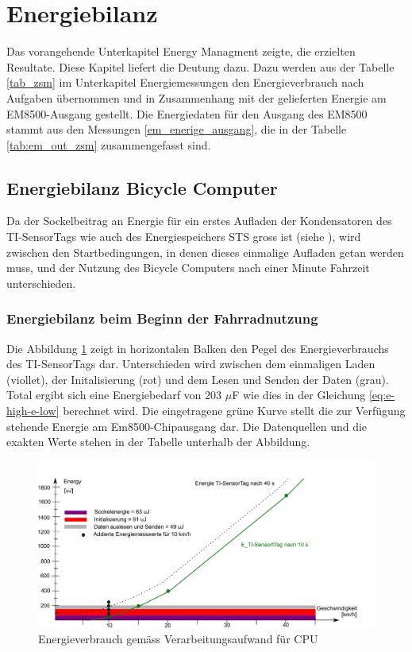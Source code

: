 \section{Energiebilanz}

Das vorangehende Unterkapitel Energy Managment zeigte, die erzielten Resultate. Diese Kapitel liefert die Deutung dazu. Dazu werden aus der Tabelle \ref{tab_zsm} im Unterkapitel Energiemessungen den Energieverbrauch nach Aufgaben übernommen und in Zusammenhang mit der gelieferten Energie am EM8500-Ausgang gestellt. Die Energiedaten für den Ausgang des EM8500 stammt aus den Messungen \ref{em_enerige_ausgang}, die in der Tabelle \ref{tab:em_out_zsm} zusammengefasst sind.

\subsection{Energiebilanz Bicycle Computer}

Da der Sockelbeitrag an Energie für ein erstes Aufladen der Kondensatoren des TI-SensorTags wie auch des Energiespeichers STS gross ist (siehe ), wird zwischen den Startbedingungen, in denen dieses einmalige Aufladen getan werden muss, und der Nutzung des Bicycle Computers nach einer Minute Fahrzeit unterschieden.


\subsubsection{Energiebilanz beim Beginn der Fahrradnutzung}

Die Abbildung \ref{r_bild_e_zusammenfassung} zeigt in horizontalen Balken den Pegel des Energieverbrauchs des TI-SensorTags dar. Unterschieden wird zwischen dem einmaligen Laden (viollet), der Initalisierung (rot) und dem Lesen und Senden der Daten (grau). Total ergibt sich eine Energiebedarf von 203 $\mu$F wie dies in der Gleichung \ref{eq:e-high-e-low} berechnet wird. Die eingetragene grüne Kurve stellt die zur Verfügung stehende Energie am Em8500-Chipausgang dar. Die Datenquellen und die exakten Werte stehen in der Tabelle unterhalb der Abbildung.

\begin{figure}[ht]
     \includegraphics[width=1\textwidth]{4Resultate/imag/EnergyVerbrauchZusammenfassung.png}
     \caption{Energieverbrauch gem\"{a}ss Verarbeitungsaufwand für CPU}
     \label{r_bild_e_zusammenfassung}
\end{figure}

